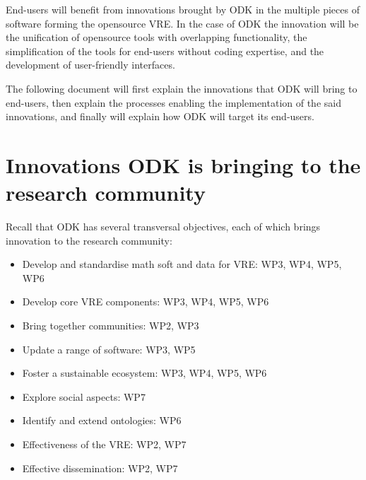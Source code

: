 \documentclass{deliverablereport}
\begin{document}
End-users will benefit from innovations brought by ODK in the
multiple pieces of software forming the opensource VRE. In the case of
ODK the innovation will be the unification of opensource
tools with overlapping functionality, the simplification of the tools
for end-users without coding expertise, and the development of
user-friendly interfaces.

The following document will first explain the innovations that
ODK will bring to end-users, then explain the processes
enabling the implementation of the said innovations, and finally will
explain how ODK will target its end-users.


\section{Innovations ODK is bringing to the research community}

Recall that ODK has several transversal objectives, each of which
brings innovation to the research community:
\begin{itemize}
\item{Develop and standardise math soft and data for VRE: WP3, WP4, WP5, WP6}
\item{Develop core VRE components: WP3, WP4, WP5, WP6}
\item{Bring together communities: WP2, WP3}
\item{Update a range of software: WP3, WP5}
\item{Foster a sustainable ecosystem: WP3, WP4, WP5, WP6}
\item{Explore social aspects: WP7}
\item{Identify and extend ontologies: WP6}
\item{Effectiveness of the VRE: WP2, WP7}
\item{Effective dissemination: WP2, WP7}
\end{itemize}
\end{document}
